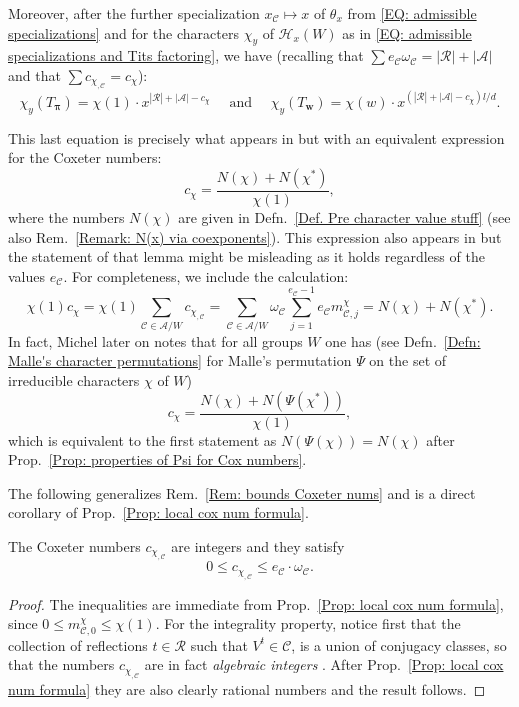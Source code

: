 \documentclass[ALCO, Unicode]{cedram}
\begin{document}
Moreover, after the further specialization $x_{\mathcal{C}}\mapsto x$ of $\theta_x$ from \eqref{EQ: admissible specializations} and for the characters $\chi_y$ of $\mathcal{H}_x(W)$ as in \eqref{EQ: admissible specializations and Tits factoring}, we have (recalling that $\sum e_{\mathcal{C}}\omega_{\mathcal{C}}=|\mathcal{R}|+|\mathcal{A}|$ and that $\sum c_{\chi_{,\mathcal{C}}}=c_{\chi}$):
\begin{equation}
\chi_y(T_{\bm \pi})=\chi(1)\cdot x^{|\mathcal{R}|+|\mathcal{A}|-c_{\chi}}\quad\text{ and }\quad\chi_y(T_{\bm w})=\chi(w)\cdot x^{(|\mathcal{R}|+|\mathcal{A}|-c_{\chi})l/d}.\label{EQ: character values via Coxeter-not local}\end{equation}


\begin{rema}\label{Remark: cox numbers and N(x)+N(x*)}
This last equation is precisely what appears in \cite[Prop.~4.18]{broue-michel-french-paper} but with an equivalent expression for the Coxeter numbers: $$c_{\chi}=\dfrac{N(\chi)+N(\chi^*)}{\chi(1)},$$ where the numbers $N(\chi)$ are given in Defn.~\ref{Def. Pre character value stuff} (see also Rem.~\ref{Remark: N(x) via coexponents}). This expression also appears in \cite[Lemma~1]{michel-deligne-lusztig-derivation} but the statement of that lemma might be misleading as it holds regardless of the values $e_{\mathcal{C}}$. For completeness, we include the calculation: $$\chi(1)c_{\chi}=\chi(1)\sum_{\mathcal{C}\in\mathcal{A}/W}c_{\chi_{,\mathcal{C}}}=\sum_{\mathcal{C}\in\mathcal{A}/W}\omega_{\mathcal{C}}\sum_{j=1}^{e_{\mathcal{C}}-1}e_{\mathcal{C}}m^{\chi}_{\mathcal{C},j}=N(\chi)+N(\chi^*).$$
In fact, Michel later on \cite[Rem.~2]{michel-deligne-lusztig-derivation} notes that for all groups $W$ one has (see Defn.~\ref{Defn: Malle's character permutations} for Malle's permutation $\Psi$ on the set of irreducible characters $\chi$ of $W$) $$c_{\chi}=\dfrac{N(\chi)+N(\Psi(\chi^*))}{\chi(1)},$$ which is equivalent to the first statement as $N(\Psi(\chi))=N(\chi)$ after Prop.~\ref{Prop: properties of Psi for Cox numbers}.
\end{rema}

The following generalizes Rem.~\ref{Rem: bounds Coxeter nums} and is a direct corollary of Prop.~\ref{Prop: local cox num formula}.

\begin{coro}\label{Corol: local cox num are integers andbounds}
The Coxeter numbers $c_{\chi_{,\mathcal{C}}}$ are integers and they satisfy $$ 0\leq c_{\chi_{,\mathcal{C}}}\leq e_{\mathcal{C}}\cdot\omega_{\mathcal{C}}.$$
\end{coro}
\begin{proof}
The inequalities are immediate from Prop.~\ref{Prop: local cox num formula}, since $0\leq m^{\chi}_{\mathcal{C},0}\leq \chi(1)$. For the integrality property, notice first that the collection of reflections $t\in \mathcal{R}$ such that $V^t\in\mathcal{C}$, is a union of conjugacy classes, so that the numbers $c_{\chi_{,\mathcal{C}}}$ are in fact \emph{algebraic integers} \cite[Corol.~1, p.~52]{Serre}. After Prop.~\ref{Prop: local cox num formula} they are also clearly rational numbers and the result follows.
\end{proof}
\end{document}
